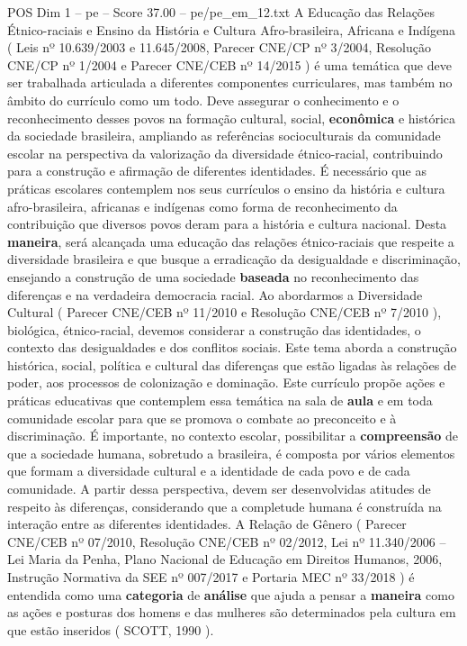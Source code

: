 \begin{textsample}{POS Dim 1 – pe – Score 37.00 – pe/pe\_em\_12.txt}
A Educação das Relações Étnico-raciais e Ensino da História e Cultura Afro-brasileira, Africana e Indígena ( Leis nº 10.639/2003 e 11.645/2008, Parecer CNE/CP nº 3/2004, Resolução CNE/CP nº 1/2004 e Parecer CNE/CEB nº 14/2015 ) é uma temática que deve ser trabalhada articulada a diferentes componentes curriculares, mas também no âmbito do currículo como um todo.
Deve assegurar o conhecimento e o reconhecimento desses povos na formação cultural, social, \textbf{econômica} e histórica da sociedade brasileira, ampliando as referências socioculturais da comunidade escolar na perspectiva da valorização da diversidade étnico-racial, contribuindo para a construção e afirmação de diferentes identidades.
É necessário que as práticas escolares contemplem nos seus currículos o ensino da história e cultura afro-brasileira, africanas e indígenas como forma de reconhecimento da contribuição que diversos povos deram para a história e cultura nacional.
Desta \textbf{maneira}, será alcançada uma educação das relações étnico-raciais que respeite a diversidade brasileira e que busque a erradicação da desigualdade e discriminação, ensejando a construção de uma sociedade \textbf{baseada} no reconhecimento das diferenças e na verdadeira democracia racial.
Ao abordarmos a Diversidade Cultural ( Parecer CNE/CEB nº 11/2010 e Resolução CNE/CEB nº 7/2010 ), biológica, étnico-racial, devemos considerar a construção das identidades, o contexto das desigualdades e dos conflitos sociais.
Este tema aborda a construção histórica, social, política e cultural das diferenças que estão ligadas às relações de poder, aos processos de colonização e dominação.
Este currículo propõe ações e práticas educativas que contemplem essa temática na sala de \textbf{aula} e em toda comunidade escolar para que se promova o combate ao preconceito e à discriminação.
É importante, no contexto escolar, possibilitar a \textbf{compreensão} de que a sociedade humana, sobretudo a brasileira, é composta por vários elementos que formam a diversidade cultural e a identidade de cada povo e de cada comunidade.
A partir dessa perspectiva, devem ser desenvolvidas atitudes de respeito às diferenças, considerando que a completude humana é construída na interação entre as diferentes identidades.
A Relação de Gênero ( Parecer CNE/CEB nº 07/2010, Resolução CNE/CEB nº 02/2012, Lei nº 11.340/2006 – Lei Maria da Penha, Plano Nacional de Educação em Direitos Humanos, 2006, Instrução Normativa da SEE nº 007/2017 e Portaria MEC nº 33/2018 ) é entendida como uma \textbf{categoria} de \textbf{análise} que ajuda a pensar a \textbf{maneira} como as ações e posturas dos homens e das mulheres são determinados pela cultura em que estão inseridos ( SCOTT, 1990 ).

\end{textsample}

